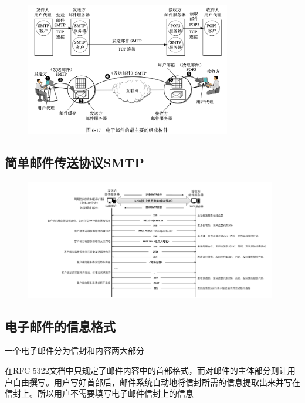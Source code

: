 \documentclass[cs4size,a4paper,10pt]{ctexart}
\begin{document}
	\begin{figure}[H]
		\centering
		\includegraphics[width=0.8\textwidth]{img/6.17}
	\end{figure}

	\subsection{简单邮件传送协议SMTP}
	\begin{figure}[H]
		\centering
		\includegraphics[width=0.98\textwidth]{img/6.5.2}
	\end{figure}

	\subsection{电子邮件的信息格式}
	一个电子邮件分为信封和内容两大部分

	在RFC 5322文档中只规定了邮件内容中的首部格式，而对邮件的主体部分则让用户自由撰写。用户写好首部后，邮件系统自动地将信封所需的信息提取出来并写在信封上。所以用户不需要填写电子邮件信封上的信息
\end{document}
